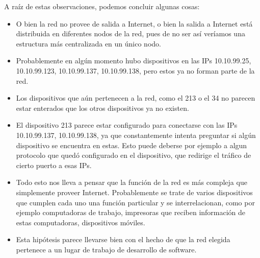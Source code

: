 A raíz de estas observaciones, podemos concluir algunas cosas:
\begin{itemize}
  \item O bien la red no provee de salida a Internet, o bien la salida a Internet está distribuida en diferentes nodos de la red, pues de no ser así veríamos una estructura más centralizada en un único nodo.
  \item Probablemente en algún momento hubo dispositivos en las IPs 10.10.99.25, 10.10.99.123, 10.10.99.137, 10.10.99.138, pero estos ya no forman parte de la red.
  \item Los dispositivos que aún pertenecen a la red, como el 213 o el 34 no parecen estar enterados que los otros dispositivos ya no existen.
  \item El dispositivo 213 parece estar configurado para conectarse con las IPs 10.10.99.137, 10.10.99.138, ya que constantemente intenta preguntar si algún dispositivo se encuentra en estas. Esto puede deberse por ejemplo a algun protocolo que quedó configurado en el dispositivo, que redirige el tráfico de cierto puerto a esas IPs.
  \item Todo esto nos lleva a pensar que la función de la red es más compleja que simplemente proveer Internet. Probablemente se trate de varios dispositivos que cumplen cada uno una función particular y se interrelacionan, como por ejemplo computadoras de trabajo, impresoras que reciben información de estas computadoras, dispositivos móviles.
  \item Esta hipótesis parece llevarse bien con el hecho de que la red elegida pertenece a un lugar de trabajo de desarrollo de software.
\end{itemize}

